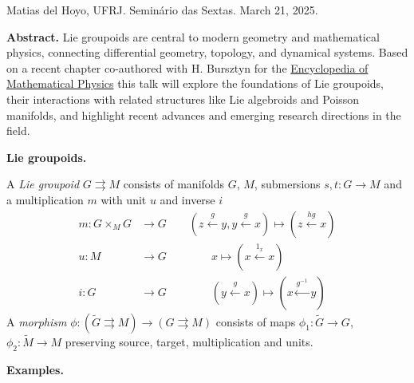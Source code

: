 \noindent
Matias del Hoyo, UFRJ.
Seminário das Sextas.
March 21, 2025.

\medskip\noindent
{\bf Abstract.}
Lie groupoids are central to modern geometry
and mathematical physics, connecting
differential geometry, topology, and
dynamical systems. Based on a recent chapter
co-authored with H. Bursztyn for the
\href{https://www.sciencedirect.com/science/article/abs/pii/B9780323957038000240}{Encyclopedia
of Mathematical Physics} this talk will
explore the foundations of Lie groupoids,
their interactions with related structures
like Lie algebroids and Poisson manifolds,
and highlight recent advances and emerging
research directions in the field.

\medskip\noindent
{\bf Lie groupoids.}

\begin{definition}
\label{definition-hoyo-lie-groupoid}
A \emph{Lie groupoid} $G \rightrightarrows M$
consists of manifolds $G$, $M$, submersions
$s,t:G \to M$ and a multiplication $m$ with
unit $u$ and inverse $i$
$$
\begin{aligned}
m: G \times_M G &\to G \qquad (z
\overset{g}{\leftarrow }y,
y\overset{g}{\leftarrow } x )\mapsto
(z\overset{hg}{\leftarrow }x) \\
u:M &\to G \qquad \qquad x \mapsto (x
\overset{1_x}{\leftarrow }x) \\
i:G &\to G \qquad \qquad (y
\overset{g}{\leftarrow }x)\mapsto
(x\overset{g^{-1}}{\leftarrow }y)
\end{aligned}
$$
A \emph{morphism}
$\phi:(\tilde{G}\rightrightarrows M) \to (G
\rightrightarrows M)$ consists of maps
$\phi_1:\tilde{G} \to G$, $\phi_2:\tilde{M}
\to M$ preserving source, target,
multiplication and units.
\end{definition}

\medskip\noindent
{\bf Examples.}

